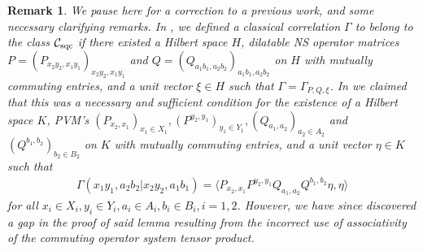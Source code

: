 \documentclass[11pt]{amsart}
\newtheorem{remark}[theorem]{Remark}
\newcommand{\cl}[1]{\mathcal{#1}}
\begin{document}
\begin{remark}\label{change_in_defn}
\rm We pause here for a correction to a previous work, and some necessary clarifying remarks. In \cite{gt_one}, we defined a classical correlation $\Gamma$ to belong to the class $\cl{C}_{\rm sqc}$  if there existed a Hilbert space $H$, dilatable NS operator matrices $P = (P_{x_{2}y_{2}, x_{1}y_{1}})_{x_{2}y_{2}, x_{1}y_{1}}$ and $Q = (Q_{a_{1}b_{1}, a_{2}b_{2}})_{a_{1}b_{1}, a_{2}b_{2}}$ on $H$ with mutually commuting entries, and a unit vector $\xi \in H$ such that $\Gamma = \Gamma_{P, Q, \xi}$. In \cite[Lemma 5.8]{gt_one} we claimed that this was a necessary and sufficient condition for the existence of a Hilbert space $K$, PVM's $(P_{x_{2}, x_{1}})_{x_{1} \in X_{1}}, (P^{y_{2}, y_{1}})_{y_{1} \in Y_{1}}, (Q_{a_{1}, a_{2}})_{a_{2} \in A_{2}}$ and $(Q^{b_{1}, b_{2}})_{b_{2} \in B_{2}}$ on $K$ with mutually commuting entries, and a unit vector $\eta \in K$ such that
\begin{gather*}
	\Gamma(x_{1}y_{1}, a_{2}b_{2}|x_{2}y_{2}, a_{1}b_{1}) = \langle P_{x_{2}, x_{1}}P^{y_{2}, y_{1}}Q_{a_{1}, a_{2}}Q^{b_{1}, b_{2}}\eta, \eta\rangle
\end{gather*}
\noindent for all $x_{i} \in X_{i}, y_{i} \in Y_{i}, a_{i} \in A_{i}, b_{i} \in B_{i}, i = 1, 2$. However, we have since discovered a gap in the proof of said lemma resulting from the incorrect use of associativity of the commuting operator system tensor product.

\medskip


\end{remark}
\end{document}
